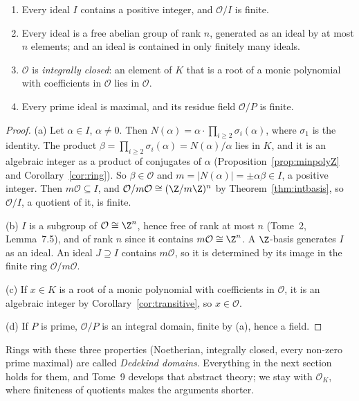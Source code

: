 \begin{proposition}\label{prop:noeth}
\begin{enumerate}[label=(\alph*)]
\item Every ideal $I$ contains a positive integer, and $\mathcal O/I$ is finite.
\item Every ideal is a free abelian group of rank $n$, generated as an ideal by at most $n$ elements; and an ideal is
contained in only finitely many ideals.
\item $\mathcal O$ is \emph{integrally closed}: an element of $K$ that is a root of a monic polynomial with coefficients in
$\mathcal O$ lies in $\mathcal O$.
\item Every prime ideal is maximal, and its residue field $\mathcal O/P$ is finite.
\end{enumerate}
\end{proposition}
\begin{proof}
(a) Let $\alpha\in I$, $\alpha\ne0$. Then $N(\alpha)=\alpha\cdot\prod_{i\ge2}\sigma_i(\alpha)$, where $\sigma_1$ is the
identity. The product $\beta=\prod_{i\ge2}\sigma_i(\alpha)=N(\alpha)/\alpha$ lies in $K$, and it is an algebraic integer
as a product of conjugates of $\alpha$ (Proposition~\ref{prop:minpolyZ} and Corollary~\ref{cor:ring}). So $\beta\in\mathcal
O$ and $m=|N(\alpha)|=\pm\alpha\beta\in I$, a positive integer. Then $m\mathcal O\subseteq I$, and $\mathcal O/m\mathcal
O\cong(\Z/m\Z)^n$ by Theorem~\ref{thm:intbasis}, so $\mathcal O/I$, a quotient of it, is finite.

(b) $I$ is a subgroup of $\mathcal O\cong\Z^n$, hence free of rank at most $n$ (Tome~2, Lemma~7.5), and of rank $n$
since it contains $m\mathcal O\cong\Z^n$. A $\Z$-basis generates $I$ as an ideal. An ideal $J\supseteq I$ contains
$m\mathcal O$, so it is determined by its image in the finite ring $\mathcal O/m\mathcal O$.

(c) If $x\in K$ is a root of a monic polynomial with coefficients in $\mathcal O$, it is an algebraic integer by
Corollary~\ref{cor:transitive}, so $x\in\mathcal O$.

(d) If $P$ is prime, $\mathcal O/P$ is an integral domain, finite by (a), hence a field.
\end{proof}

Rings with these three properties (Noetherian, integrally closed, every non-zero prime maximal) are called
\emph{Dedekind domains}. Everything in the next section holds for them, and Tome~9 develops that abstract theory; we
stay with $\mathcal O_K$, where finiteness of quotients makes the arguments shorter.

